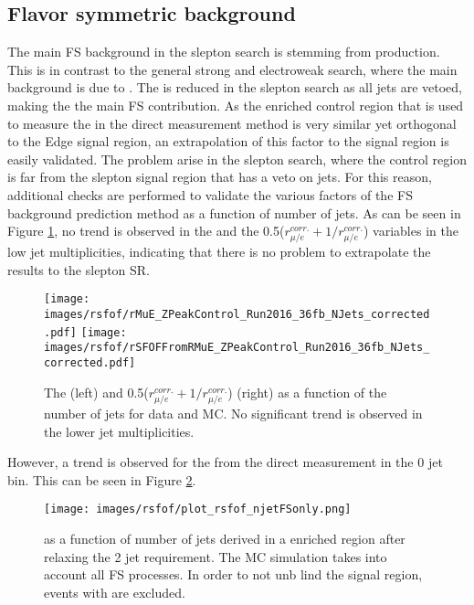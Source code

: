 \subsection*{Flavor symmetric background}
\noindent
\justify
The main FS background in the slepton search is stemming from \PWW production.
This is in contrast to the general strong and electroweak search, where the main background is due to \ttbar.
The \ttbar is reduced in the slepton search as all jets are vetoed, making the \PWW the main FS contribution.
As the \ttbar enriched control region that is used to measure the \Rsfof in the direct measurement method is very similar yet orthogonal to the Edge signal region, an extrapolation of this factor to     the signal region is easily validated.
The problem arise in the slepton search, where the \ttbar control region is far from the slepton signal region that has a veto on jets.
For this reason, additional checks are performed to validate the various factors of the FS background prediction method as a function of number of jets.
As can be seen in Figure \ref{fig:rmueSlepton}, no trend is observed in the \rmue and the 0.5($r_{\mu/e}^{corr.}+1/r_{\mu/e}^{corr.}$) variables in the low jet multiplicities, indicating that there is     no problem to extrapolate the results to the slepton SR.
\begin{figure}[htbp!]
\begin{center}
    \texttt{[image: images/rsfof/rMuE\_ZPeakControl\_Run2016\_36fb\_NJets\_corrected.pdf]}
    \texttt{[image: images/rsfof/rSFOFFromRMuE\_ZPeakControl\_Run2016\_36fb\_NJets\_corrected.pdf]}
    \caption{The \rmue (left) and 0.5($r_{\mu/e}^{corr.}+1/r_{\mu/e}^{corr.}$) (right) as a function of the number of jets for data and MC. No significant trend is observed in the lower jet multiplicities.}
\label{fig:rmueSlepton}
\end{center}
\end{figure}
However, a trend is observed for the \Rsfof from the direct measurement in the 0 jet bin. This can be seen in Figure \ref{fig:rsfofSleptonOne}.
\begin{figure}[htbp!]
\begin{center}
    \texttt{[image: images/rsfof/plot\_rsfof\_njetFSonly.png]}
    \caption{\Rsfof as a function of number of jets derived in a \ttbar enriched region after relaxing the 2 jet requirement. The MC simulation takes into account all FS processes. In order to not unb    lind the signal region, events with are excluded.}
\label{fig:rsfofSleptonOne}
\end{center}
\end{figure} 
